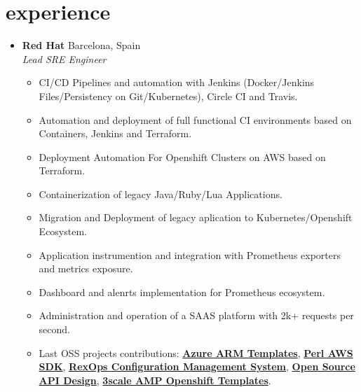 \documentclass[]{friggeri-cv} %
\renewenvironment{entrylist}{%
  \begin{itemize}[leftmargin=1in]%
}{%
  \end{itemize}
}
\renewcommand{\entry}[4]{%
  \item[#1]
    \textbf{#2}%
    \hfill%
    {\footnotesize\addfontfeature{Color=lightgray} #3}\\%
    #4\vspace{\parsep}%
  }
\begin{document}
\section{experience}
\begin{entrylist}

\entry
{2017--Now}
{Red Hat}
{Barcelona, Spain}
{\emph{Lead SRE Engineer} 
\begin{itemize}[label=\textbullet]
    \item CI/CD Pipelines and automation with Jenkins (Docker/Jenkins Files/Persistency on Git/Kubernetes), Circle CI and Travis.
    \item Automation and deployment of full functional CI environments based on Containers, Jenkins and Terraform.
    \item Deployment Automation For Openshift Clusters on AWS based on Terraform.
    \item Containerization of legacy Java/Ruby/Lua Applications.
    \item Migration and Deployment of legacy aplication to Kubernetes/Openshift Ecosystem.
    \item Application instrumention and integration with Prometheus exporters and metrics exposure. 
    \item Dashboard and alenrts implementation for Prometheus ecosystem. 
    \item Administration and operation of a SAAS platform with 2k+ requests per second.
    \item Last OSS projects contributions: \href{https://github.com/Azure/azure-quickstart-templates}{\textbf{Azure ARM Templates}}, \href{https://github.com/pplu/aws-sdk-perl}{\textbf{Perl AWS SDK}}, \href{https://github.com/RexOps/Rex}{\textbf{RexOps Configuration Management System}}, \href{https://github.com/Apicurio/apicurio-studio}{\textbf{Open Source API Design}}, \href{https://github.com/3scale/3scale-amp-openshift-templates}{\textbf{3scale AMP Openshift Templates}}.
\end{itemize}}


\end{entrylist}
\end{document}
